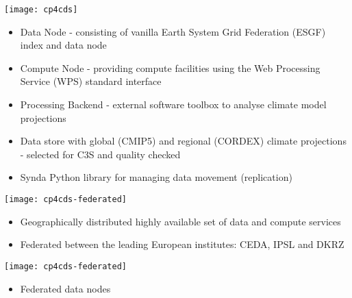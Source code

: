 \documentclass[portrait,a0paper,fontscale=0.4]{baposter} %
\newcommand{\compresslist}{%
\setlength{\itemsep}{1pt}%
\setlength{\parskip}{0pt}%
\setlength{\parsep}{0pt}%
}
\begin{document}
\begin{poster}
{   \begin{minipage}[t]{0.5\textwidth}
     \texttt{[image: cp4cds]}
     \begin{itemize}\compresslist
       \item Data Node - consisting of vanilla Earth System Grid Federation (ESGF) index and data node
       \item Compute Node - providing compute facilities using the Web Processing Service (WPS) standard interface
       \item Processing Backend - external software toolbox to analyse climate model projections
       \item Data store with global (CMIP5) and regional (CORDEX) climate projections - selected for C3S and quality checked
       \item Synda Python library for managing data movement (replication)
     \end{itemize}
  \end{minipage}
  \begin{minipage}[t]{0.25\textwidth}
    \texttt{[image: cp4cds-federated]}
    \begin{itemize}\compresslist
      \item Geographically distributed highly available set of data and compute services
      \item Federated between the leading European institutes: CEDA, IPSL and DKRZ
    \end{itemize}
  \end{minipage}
  \begin{minipage}[t]{0.25\textwidth}
    \texttt{[image: cp4cds-federated]}
    \begin{itemize}\compresslist
      \item Federated data nodes
    \end{itemize}
  \end{minipage}
 }


\end{poster}
\end{document}
